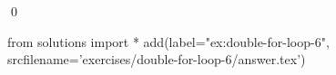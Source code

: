 
    \begin{ex}
  \label{ex:double-for-loop-6}
  
  \qed
\end{ex}
\begin{python0}
from solutions import *
add(label="ex:double-for-loop-6",
    srcfilename='exercises/double-for-loop-6/answer.tex') 
\end{python0}                              
